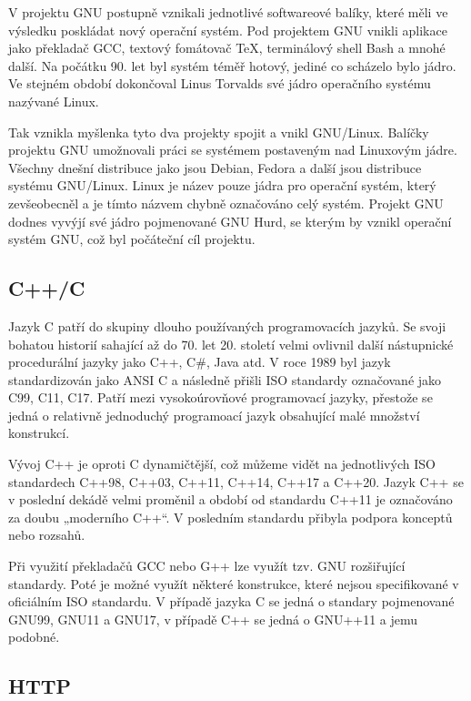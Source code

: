 V projektu GNU postupně vznikali jednotlivé softwareové balíky, které měli ve výsledku poskládat nový operační systém. Pod projektem GNU vnikli aplikace jako překladač GCC,
textový fomátovač TeX, terminálový shell Bash a mnohé další. Na počátku 90. let byl systém téměř hotový, jediné co scházelo bylo jádro. Ve stejném období dokončoval
Linus Torvalds své jádro operačního systému nazývané Linux.\cite{GNULinux}\cite{GNULinux2} 

Tak vznikla myšlenka tyto dva projekty spojit a vnikl GNU/Linux. Balíčky projektu GNU umožnovali práci se systémem postaveným nad Linuxovým jádre. Všechny dnešní distribuce
jako jsou Debian, Fedora a další jsou distribuce systému GNU/Linux. Linux je název pouze jádra pro operační systém, který zevšeobecněl a je tímto názvem chybně označováno
celý systém. Projekt GNU dodnes vyvýjí své jádro pojmenované GNU Hurd, se kterým by vznikl operační systém GNU, což byl počáteční cíl projektu.\cite{GNULinux2}

\subsection{C++/C}

Jazyk C patří do skupiny dlouho používaných programovacích jazyků. Se svoji bohatou historií sahající až do 70. let 20. století velmi ovlivnil další nástupnické procedurální
jazyky jako C++, C\#, Java atd. V roce 1989 byl jazyk standardizován jako ANSI C a následně přišli ISO standardy označované jako C99, C11, C17. Patří mezi vysokoúrovňové
programovací jazyky, přestože se jedná o relativně jednoduchý programoací jazyk obsahující malé množství konstrukcí.\cite{CReference}

Vývoj C++ je oproti C dynamičtější, což můžeme vidět na jednotlivých ISO standardech C++98, C++03, C++11, C++14, C++17 a C++20. Jazyk C++ se v poslední dekádě velmi
proměnil a období od standardu C++11 je označováno za doubu „moderního C++“. V posledním standardu přibyla podpora konceptů nebo rozsahů.\cite{CPPReference}

Při využití překladačů GCC nebo G++ lze využít tzv. GNU rozšiřující standardy. Poté je možné využít některé konstrukce, které nejsou specifikované v oficiálním ISO standardu.
V případě jazyka C se jedná o standary pojmenované GNU99, GNU11 a GNU17, v případě C++ se jedná o GNU++11 a jemu podobné.

\subsection{HTTP}

